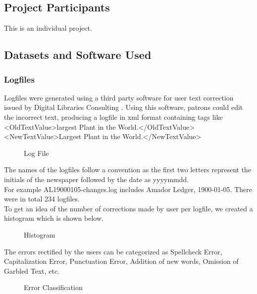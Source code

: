 \subsection{Project Participants}
This is an individual project.

\subsection{Datasets and Software Used}
\subsubsection{Logfiles}
Logfiles were generated using a third party software for user text correction issued by Digital Libraries Consulting \cite{digital}. Using this software, patrons could edit the incorrect text, producing a logfile in xml format containing tags like \\
\textless OldTextValue\textgreater largest Plant in the World.\textless/OldTextValue\textgreater \\ 
\textless NewTextValue\textgreater Largest Plant in the World.\textless/NewTextValue\textgreater \\
\begin{figure}[ht!]
\centering
\caption{Log File}
\label{fig:Logfile}
\end{figure}

The names of the logfiles follow a convention as the first two letters represent the initials of the newspaper followed by the date as yyyymmdd.\\ For example AL19000105-changes.log includes Amador Ledger, 1900-01-05. There were in total 234 logfiles. \\

To get an idea of the number of corrections made by user per logfile, we created a histogram which is shown below. \\
\begin{figure}[ht!]
\centering
\caption{Histogram}
\label{fig:histogram}
\end{figure}

The errors rectified by the users can be categorized as Spellcheck Error, Capitalization Error, Punctuation Error, Addition of new words, Omission of Garbled Text, etc.\\
\begin{figure}[h]
\centering
\caption{Error Classification}
\label{fig:Statistics}
\end{figure}


